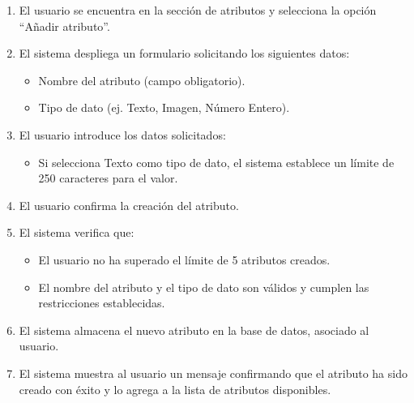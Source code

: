 \begin{enumerate}
    \item El usuario se encuentra en la sección de atributos y selecciona la opción “Añadir atributo”.
    \item El sistema despliega un formulario solicitando los siguientes datos:
    \begin{itemize}
        \item Nombre del atributo (campo obligatorio).
        \item Tipo de dato (ej. Texto, Imagen, Número Entero).
    \end{itemize}
    \item El usuario introduce los datos solicitados:
    \begin{itemize}
        \item Si selecciona Texto como tipo de dato, el sistema establece un límite de 250 caracteres para el valor.
    \end{itemize}
    \item El usuario confirma la creación del atributo.
    \item El sistema verifica que:
    \begin{itemize}
        \item El usuario no ha superado el límite de 5 atributos creados.
        \item El nombre del atributo y el tipo de dato son válidos y cumplen las restricciones establecidas.
    \end{itemize}
    \item El sistema almacena el nuevo atributo en la base de datos, asociado al usuario.
    \item El sistema muestra al usuario un mensaje confirmando que el atributo ha sido creado con éxito y lo agrega a la lista de atributos disponibles.
\end{enumerate}

